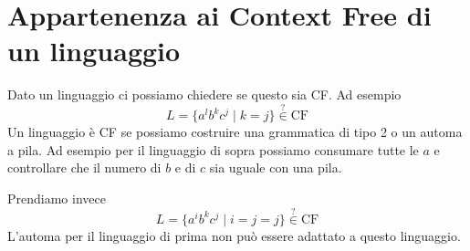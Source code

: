 \documentclass[12pt]{report}
\theoremstyle{definition}
\theoremstyle{regard}
\begin{document}
\section{Appartenenza ai Context Free di un linguaggio}
Dato un linguaggio ci possiamo chiedere se questo sia CF.
Ad esempio
$$ L = \{ a^l b^k c^j \mid k = j \} \overset{?}{\in} \text{CF} $$
Un linguaggio è CF se possiamo costruire una grammatica di tipo 2 o un automa a pila.
Ad esempio per il linguaggio di sopra possiamo consumare tutte le $a$ e controllare che il numero di $b$ e di $c$ sia uguale con una pila.

Prendiamo invece
$$ L = \{ a^i b^k c^j \mid i = j = j \} \overset{?}{\in} \text{CF} $$
L'automa per il linguaggio di prima non può essere adattato a questo linguaggio.
\end{document}
